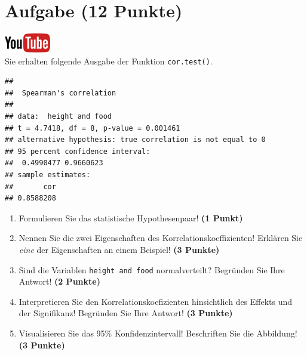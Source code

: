 \documentclass[a4paper, 10pt]{scrartcl}\usepackage[]{graphicx}\usepackage[]{xcolor}
\makeatletter
\newenvironment{kframe}{%
 \def\at@end@of@kframe{}%
 \ifinner\ifhmode%
  \def\at@end@of@kframe{\end{minipage}}%
  \begin{minipage}{\columnwidth}%
 \fi\fi%
 \def\FrameCommand##1{\hskip\@totalleftmargin \hskip-\fboxsep
 \colorbox{shadecolor}{##1}\hskip-\fboxsep
     \hskip-\linewidth \hskip-\@totalleftmargin \hskip\columnwidth}%
 \MakeFramed {\advance\hsize-\width
   \@totalleftmargin\z@ \linewidth\hsize
   \@setminipage}}%
 {\par\unskip\endMakeFramed%
 \at@end@of@kframe}
\newenvironment{knitrout}{}{} %
\makeatother
\begin{document}
 
\clearpage

\section{Aufgabe \hfill (12 Punkte)}

\hfill\href{https://youtu.be/C9skfFRTHhI}{\includegraphics[width =
   2cm]{img/youtube}}\\[1Ex]

Sie erhalten folgende \Rlogo Ausgabe der Funktion \texttt{cor.test()}.

\begin{knitrout}
\color{fgcolor}\begin{kframe}
\begin{verbatim}
## 
## 	Spearman's correlation
## 
## data:  height and food
## t = 4.7418, df = 8, p-value = 0.001461
## alternative hypothesis: true correlation is not equal to 0
## 95 percent confidence interval:
##  0.4990477 0.9660623
## sample estimates:
##       cor 
## 0.8588208
\end{verbatim}
\end{kframe}
\end{knitrout}


\begin{enumerate}
  \item Formulieren Sie das statistische Hypothesenpaar! \textbf{(1
Punkt)}
\item Nennen Sie die zwei Eigenschaften des Korrelationskoeffizienten!
  Erkl{\"a}ren Sie \textit{eine} der Eigenschaften an einem Beispiel! \textbf{(3
    Punkte)}
\item Sind die Variablen \texttt{height and food} normalverteilt?
  Begr{\"u}nden Sie Ihre Antwort! \textbf{(2 Punkte)}
\item Interpretieren Sie den Korrelationskoefizienten hinsichtlich des
  Effekts und der Signifikanz! Begr{\"u}nden Sie
  Ihre Antwort! \textbf{(3 Punkte)}
\item Visualisieren Sie das 95\% Konfidenzintervall! Beschriften Sie die Abbildung! \textbf{(3 Punkte)} 
\end{enumerate} 
\clearpage
\end{document}
